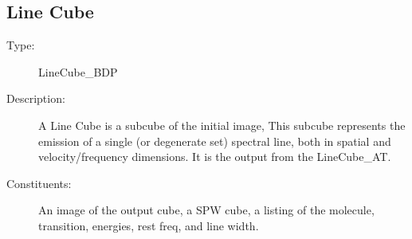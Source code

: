 \subsection{Line Cube}
\begin{description}
\item[Type:] LineCube\_BDP
\item[Description:]
A Line Cube is a subcube of the initial image, This subcube represents the emission of a single (or degenerate set) spectral line, both in spatial and velocity/frequency dimensions. It is the output from the LineCube\_AT.

\item[Constituents:] An image of the output cube, a SPW cube, a listing of the molecule, transition, energies, rest freq, and line width.


\end{description}
